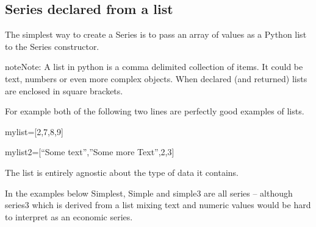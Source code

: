 \documentclass[letterpaper,10pt,english]{jupyterBook}
\begin{document}
\subsection{Series declared from a list}
\label{\detokenize{content/04_PythonEssentials/PythonPandasDataframes:series-declared-from-a-list}}
\sphinxAtStartPar
The simplest way to create a Series is to pass an array of values as a Python list to the Series constructor.

\begin{sphinxadmonition}{note}{Note:}
\sphinxAtStartPar
A list in python is a comma delimited collection of items.  It could be text, numbers or even more complex objects.  When declared (and returned) lists are enclosed in square brackets.

\sphinxAtStartPar
For example both of the following two lines are perfectly good examples of lists.

\sphinxAtStartPar
mylist={[}2,7,8,9{]}

\sphinxAtStartPar
mylist2={[}“Some text”,”Some more Text”,2,3{]}

\sphinxAtStartPar
The list is entirely agnostic about the type of data it contains.
\end{sphinxadmonition}

\sphinxAtStartPar
In the examples below Simplest, Simple and simple3 are all series – although series3 which is derived from a list mixing text and numeric values would be hard to interpret as an economic series.
\end{document}
